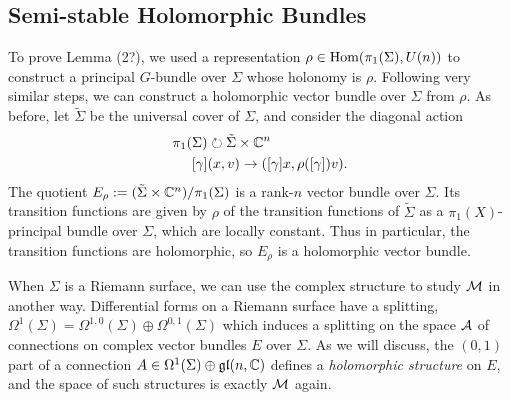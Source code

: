 	\subsection{Semi-stable Holomorphic Bundles}
	To prove Lemma (2?), we used a representation $\rho\in\text{Hom}(\pi_1(\Sigma), U(n))$ to construct a principal $G$-bundle over $\Sigma$ whose holonomy is $\rho$. Following very similar steps, we can construct a holomorphic vector bundle over $\Sigma$ from $\rho$. As before, let $\tilde{\Sigma}$ be the universal cover of $\Sigma$, and consider the diagonal action
	\begin{align*}
	\pi_1(\Sigma)&\circlearrowright \tilde{\Sigma}\times \mathbb{C}^n\\
	[\gamma] & (x, v) \to ([\gamma]x, \rho([\gamma])v).
	\end{align*}
	The quotient $E_\rho := (\tilde{\Sigma}\times \mathbb{C}^n)/\pi_1(\Sigma)$ is a rank-$n$ vector bundle over $\Sigma$. Its transition functions are given by $\rho$ of the transition functions of $\tilde{\Sigma}$ as a $\pi_1(X)$-principal bundle over $\Sigma$, which are locally constant. Thus in particular, the transition functions are holomorphic, so $E_\rho$ is a holomorphic vector bundle. 
	
	When $\Sigma$ is a Riemann surface, we can use the complex structure to study $\mathcal{M}$ in another way. Differential forms on a Riemann surface have a splitting, $\Omega^1(\Sigma) = \Omega^{1,0}(\Sigma)\oplus \Omega^{0,1}(\Sigma)$ which induces a splitting on the space $\mathcal{A}$ of connections on complex vector bundles $E$ over $\Sigma$. As we will discuss, the $(0,1)$ part of a connection $A\in \Omega^1(\Sigma)\oplus \mathfrak{gl}(n,\mathbb{C})$ defines a \emph{holomorphic structure} on $E$, and the space of such structures is exactly $\mathcal{M}$ again.
	
